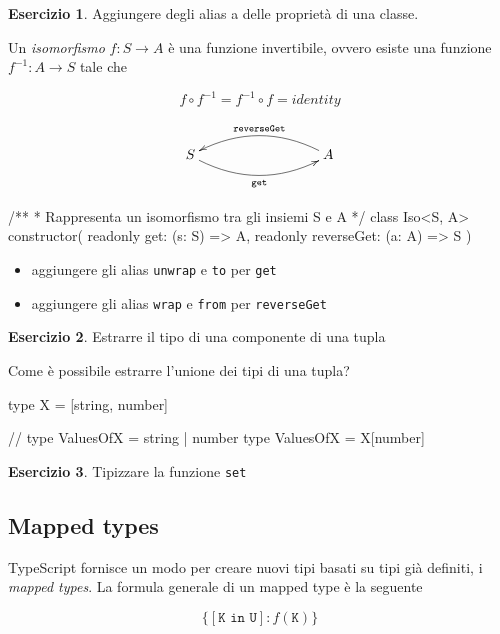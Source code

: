 \documentclass[12pt]{article}
\theoremstyle{definition}
\newtheorem{exercise}{Esercizio}[subsection]
\newenvironment{code}
  {\vspace{0.5cm} \VerbatimEnvironment\begin{typescriptcode}}
  {\end{typescriptcode} \vspace{0.2cm}}
\begin{document}
\begin{exercise}
Aggiungere degli alias a delle proprietà di una classe.

Un \emph{isomorfismo} $f: S \rightarrow A$ è una funzione invertibile, ovvero esiste una funzione $f^{-1}: A \rightarrow S$ tale che

$$
f \circ f^{-1} = f^{-1} \circ f = identity
$$

\[
\xymatrixrowsep{3cm}
\xymatrixcolsep{3cm}
\xymatrix{
  S \ar@/_0.5cm/[r]_{\texttt{get}} & A \ar@/_0.5cm/[l]_{\texttt{reverseGet}}
}
\]

\begin{code}
/**
 * Rappresenta un isomorfismo tra gli insiemi S e A
 */
class Iso<S, A> {
  constructor(
    readonly get: (s: S) => A,
    readonly reverseGet: (a: A) => S
  ) {}
}
\end{code}

\begin{itemize}
  \item aggiungere gli alias \texttt{unwrap} e \texttt{to} per \texttt{get}
  \item aggiungere gli alias \texttt{wrap} e \texttt{from} per \texttt{reverseGet}
\end{itemize}

\end{exercise}

\begin{exercise}
Estrarre il tipo di una componente di una tupla
\end{exercise}

Come è possibile estrarre l'unione dei tipi di una tupla?

\begin{code}
type X = [string, number]

// type ValuesOfX = string | number
type ValuesOfX = X[number]
\end{code}

\begin{exercise}
Tipizzare la funzione \texttt{set}
\end{exercise}

\subsection{Mapped types}

TypeScript fornisce un modo per creare nuovi tipi basati su tipi già definiti, i \emph{mapped types}.
La formula generale di un mapped type è la seguente

$$
\{ [\texttt{K in U}]: f(\texttt{K}) \}
$$
\end{document}
